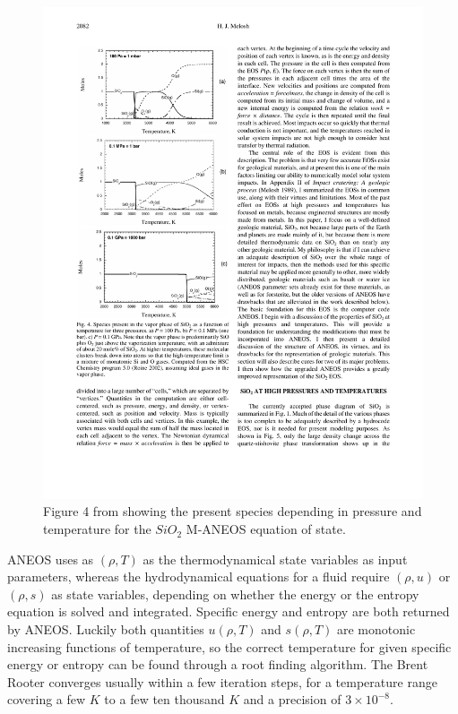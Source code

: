 \begin{figure}
\includegraphics[scale=1.0]{05aneos_phases03}
\caption{Figure 4 from \cite{Melosh:2007p3502} showing the present species depending in pressure and temperature for the $SiO_2$ M-ANEOS equation of state.}
\label{ch02_fig05}
\end{figure}

ANEOS uses as $(\rho, T)$ as the thermodynamical state variables as input parameters, whereas the hydrodynamical equations for a fluid require $(\rho, u)$ or $(\rho, s)$ as state variables, depending on whether the energy or the entropy equation is solved and integrated. Specific energy and entropy are both returned by ANEOS. Luckily both quantities $u(\rho, T)$ and  $s(\rho, T)$ are monotonic increasing functions of temperature, so the correct temperature for given specific energy or entropy can be found through a root finding algorithm. The Brent Rooter \citep{Press2002nrc..book.....P} converges usually within a few iteration steps, for a temperature range covering a few $K$ to a few ten thousand $K$ and a precision of $3 \times 10^{-8}$.

